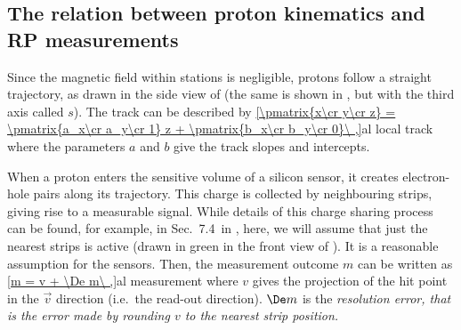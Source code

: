 \subsection[al psi]{The relation between proton kinematics and RP measurements}

Since the magnetic field within  stations is negligible, protons follow a straight trajectory, as drawn in the side view of  (the same is shown in , but with the third axis called $s$). The track can be described by
\eqref{\pmatrix{x\cr y\cr z} = \pmatrix{a_x\cr a_y\cr 1} z + \pmatrix{b_x\cr b_y\cr 0}\ ,}{al local track}
where the parameters $a$ and $b$ give the track slopes and intercepts.

When a proton enters the sensitive volume of a silicon sensor, it creates electron-hole pairs along its trajectory. This charge is collected by neighbouring strips, giving rise to a measurable signal. While details of this charge sharing process can be found, for example, in Sec.~7.4~in , here, we will assume that just the nearest strips is active (drawn in green in the front view of ). It is a reasonable assumption for the  sensors. Then, the measurement outcome $m$ can be written as
\eqref{m = v + \De m\ ,}{al measurement}
where $v$ gives the projection of the hit point in the $\vec v$ direction (i.e.~the read-out direction). $\De m$ is the \em{resolution error}, that is the error made by rounding $v$ to the nearest strip position.


